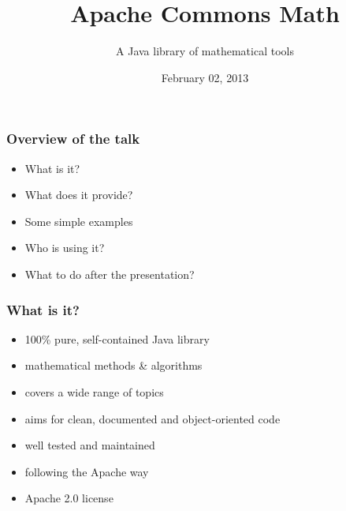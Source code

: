 \documentclass[10pt,mathserif]{beamer}
\title{Apache Commons Math}
\subtitle{A Java library of mathematical tools}
\author{
  \newauthor{Thomas Neidhart}{tn@apache.org}
\and
  \newauthor{Gilles Sadowski}{erans@apache.org}
}
\institute[FOSDEM 2013]{FOSDEM 2013}
\date{February 02, 2013}
\begin{document}

\begin{frame} %
  \titlepage
\end{frame}

\begin{frame}
  \frametitle{Overview of the talk}

\begin{itemize}
  \item What is it?
  \item What does it provide?
  \item Some simple examples
  \item Who is using it?
  \item What to do after the presentation?
\end{itemize}

\end{frame}

\begin{frame}
  \frametitle{What is it?}

\begin{itemize}
  \item 100\% pure, self-contained Java library
  \item mathematical methods \& algorithms
  \item covers a wide range of topics
  \item aims for clean, documented and object-oriented code
  \item well tested and maintained
  \item following the Apache way
  \item Apache 2.0 license
\end{itemize}

\end{frame}



\end{document}
